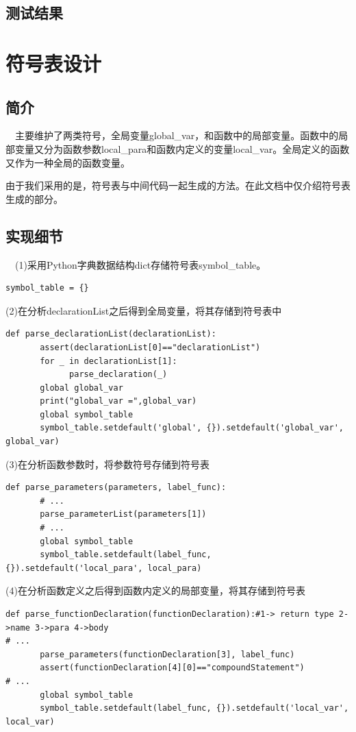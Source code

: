\documentclass{article}
\begin{document}
\subsection{测试结果}

\section{符号表设计}

\subsection{简介}

\quad\ \    主要维护了两类符号，全局变量global\_var，和函数中的局部变量。函数中的局部变量又分为函数参数local\_para和函数内定义的变量local\_var。全局定义的函数又作为一种全局的函数变量。

由于我们采用的是，符号表与中间代码一起生成的方法。在此文档中仅介绍符号表生成的部分。

\subsection{实现细节}

\quad \ \ (1)采用Python字典数据结构dict存储符号表symbol\_table。
\begin{verbatim}
symbol_table = {}
\end{verbatim}


(2)在分析declarationList之后得到全局变量，将其存储到符号表中
\begin{verbatim}
def parse_declarationList(declarationList):
       assert(declarationList[0]=="declarationList")
       for _ in declarationList[1]:
             parse_declaration(_)
       global global_var
       print("global_var =",global_var)
       global symbol_table
       symbol_table.setdefault('global', {}).setdefault('global_var', global_var)
\end{verbatim}


(3)在分析函数参数时，将参数符号存储到符号表
\begin{verbatim}
def parse_parameters(parameters, label_func):
       # ...
       parse_parameterList(parameters[1])
       # ...
       global symbol_table
       symbol_table.setdefault(label_func, {}).setdefault('local_para', local_para)
\end{verbatim}

(4)在分析函数定义之后得到函数内定义的局部变量，将其存储到符号表
\begin{verbatim}
def parse_functionDeclaration(functionDeclaration):#1-> return type 2->name 3->para 4->body
# ...
       parse_parameters(functionDeclaration[3], label_func)
       assert(functionDeclaration[4][0]=="compoundStatement")
# ...
       global symbol_table
       symbol_table.setdefault(label_func, {}).setdefault('local_var', local_var)
\end{verbatim}
\end{document}
